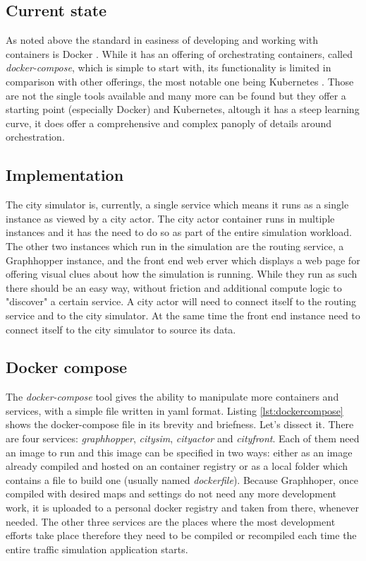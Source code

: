 \documentclass[conference]{IEEEtran}
\begin{document}
\subsection{Current state}

As noted above the standard in easiness of developing and working with containers is Docker \cite{docker}. While it has an offering of orchestrating containers, called \textit{docker-compose}, which is simple to start with, its functionality is limited in comparison with other offerings, the most notable one being Kubernetes \cite{Kubernetes}. Those are not the single tools available and many more can be found but they offer a starting point (especially Docker) and Kubernetes, altough it has a steep learning curve, it does offer a comprehensive and complex panoply of details around orchestration.

\subsection{Implementation}

The city simulator is, currently, a single service which means it runs as a single instance as viewed by a city actor. The city actor container runs in multiple instances and it has the need to do so as part of the entire simulation workload. The other two instances which run in the simulation are the routing service, a Graphhopper instance, and the front end web erver which displays a web page for offering visual clues about how the simulation is running. While they run as such there should be an easy way, without friction and additional compute logic to "discover" a certain service. A city actor will need to connect itself to the routing service and to the city simulator. At the same time the front end instance need to connect itself to the city simulator to source its data.

\subsection{Docker compose}

The \textit{docker-compose} tool gives the ability to manipulate more containers and services, with a simple file written in yaml format. Listing \ref{lst:dockercompose} shows the docker-compose file in its brevity and briefness. Let's dissect it. There are four services: \textit{graphhopper}, \textit{citysim}, \textit{cityactor} and \textit{cityfront}. Each of them need an image to run and this image can be specified in two ways: either as an image already compiled and hosted on an container registry or as a local folder which contains a file to build one (usually named \textit{dockerfile}). Because Graphhoper, once compiled with desired maps and settings do not need any more development work, it is uploaded to a personal docker registry and taken from there, whenever needed. The other three services are the places where the most development efforts take place therefore they need to be compiled or recompiled each time the entire traffic simulation application starts.
\end{document}
